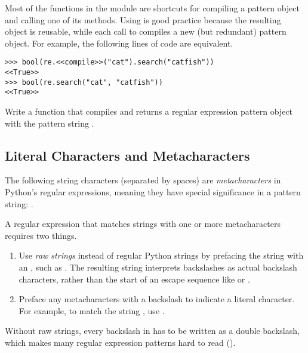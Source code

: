 Most of the functions in the  module are shortcuts for compiling a pattern object and calling one of its methods.
Using  is good practice because the resulting object is reusable, while each call to  compiles a new (but redundant) pattern object.
For example, the following lines of code are equivalent.
\begin{lstlisting}
>>> bool(re.<<compile>>("cat").search("catfish"))
<<True>>
>>> bool(re.search("cat", "catfish"))
<<True>>
\end{lstlisting}


\begin{problem} %
Write a function that compiles and returns a regular expression pattern object with the pattern string .
\label{prob:regex-superbasic}
\end{problem}

\subsection*{Literal Characters and Metacharacters} %

The following string characters (separated by spaces) are \emph{metacharacters} in Python's regular expressions, meaning they have special significance in a pattern string:
.

A regular expression that matches strings with one or more metacharacters  requires two things.
\begin{enumerate}
    \item Use \emph{raw strings} instead of regular Python strings by prefacing the string with an , such as .
The resulting string interprets backslashes as actual backslash characters, rather than the start of an escape sequence like \li{\\n} or \li{\\t}.
    \item Preface any metacharacters with a backslash to indicate a literal character.
For example, to match the string , use .

\end{enumerate}
Without raw strings, every backslash in has to be written as a double backslash, which makes many regular expression patterns hard to read ().


